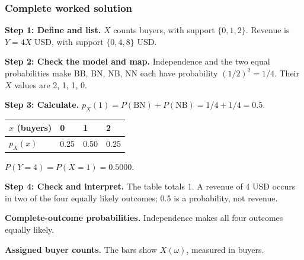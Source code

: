 \subsubsection*{Complete worked solution}
\par\noindent\begin{minipage}{\linewidth}
\textbf{Step 1: Define and list.} $X$ counts buyers, with support $\{0,1,2\}$. Revenue is $Y=4X$ USD, with support $\{0,4,8\}$ USD.
\end{minipage}\par\medskip
\par\noindent\begin{minipage}{\linewidth}
\textbf{Step 2: Check the model and map.} Independence and the two equal probabilities make BB, BN, NB, NN each have probability $(1/2)^2=1/4$. Their $X$ values are 2, 1, 1, 0.
\end{minipage}\par\medskip
\par\noindent\begin{minipage}{\linewidth}
\textbf{Step 3: Calculate.} $p_X(1)=P(\mathrm{BN})+P(\mathrm{NB})=1/4+1/4=0.5$.\begin{center}
\begin{tabular}{llll}
\toprule
$x$ (buyers) & 0 & 1 & 2 \\ \midrule
$p_X(x)$ & 0.25 & 0.50 & 0.25 \\
\bottomrule
\end{tabular}
\end{center}
$P(Y=4)=P(X=1)=0.5000$.
\end{minipage}\par\medskip
\par\noindent\begin{minipage}{\linewidth}
\textbf{Step 4: Check and interpret.} The table totals 1. A revenue of 4 USD occurs in two of the four equally likely outcomes; 0.5 is a probability, not revenue.
\end{minipage}\par\medskip
\par\noindent \begin{minipage}[t]{.485\linewidth}
\centering
{}
\par\small \textbf{Complete-outcome probabilities.} Independence makes all four outcomes equally likely.
\end{minipage}\hfill\begin{minipage}[t]{.485\linewidth}
\centering
{}
\par\small \textbf{Assigned buyer counts.} The bars show $X(\omega)$, measured in buyers.
\end{minipage}\par\medskip
